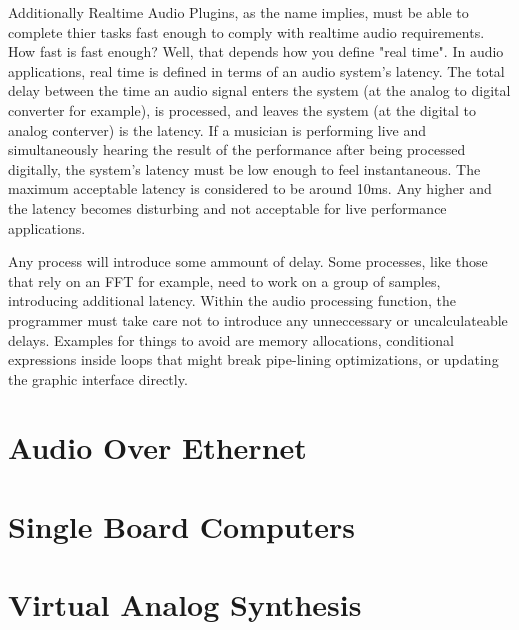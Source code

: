 Additionally Realtime Audio Plugins, as the name implies, must be able to complete thier tasks fast enough to comply with realtime audio requirements. How fast is fast enough? Well, that depends how you define "real time". In audio applications, real time is defined in terms of an audio system's latency. The total delay between the time an audio signal enters the system (at the analog to digital converter for example), is processed, and leaves the system (at the digital to analog conterver) is the latency. If a musician is performing live and simultaneously hearing the result of the performance after being processed digitally, the system's latency must be low enough to feel instantaneous. The maximum acceptable latency is considered to be around 10ms\cite{AES67-2013}. Any higher and the latency becomes disturbing and not acceptable for live performance applications.

 Any process will introduce some ammount of delay. Some processes, like those that rely on an FFT for example, need to work on a group of samples, introducing additional latency. Within the audio processing function, the programmer must take care not to introduce any unneccessary or uncalculateable delays. Examples for things to avoid are memory allocations, conditional expressions inside loops that might break pipe-lining optimizations\cite{realtime-architectures}, or updating the graphic interface directly.

\section{Audio Over Ethernet}

\section{Single Board Computers}

\section{Virtual Analog Synthesis}